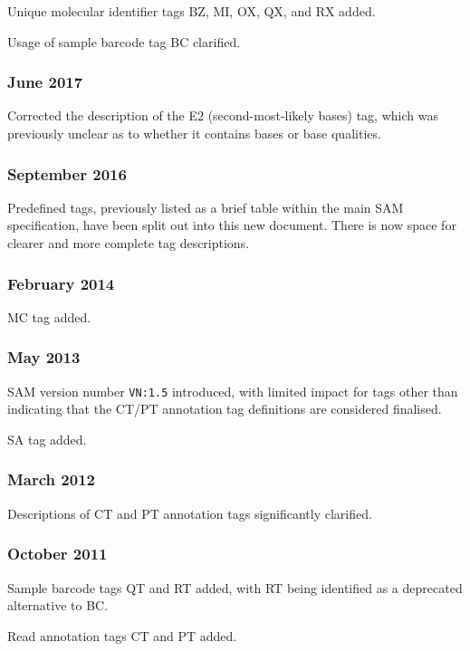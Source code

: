 \documentclass[10pt]{article}
\begin{document}
\begin{appendices}
Unique molecular identifier tags BZ, MI, OX, QX, and RX added.

Usage of sample barcode tag BC clarified.

\subsubsection*{June 2017}

Corrected the description of the E2 (second-most-likely bases) tag, which was previously unclear as to whether it contains bases or base qualities.

\subsubsection*{September 2016}

Predefined tags, previously listed as a brief table within the main SAM specification, have been split out into this new document.
There is now space for clearer and more complete tag descriptions.

\subsubsection*{February 2014}

MC tag added.

\subsubsection*{May 2013}

SAM version number {\tt VN:1.5} introduced, with limited impact for tags other than indicating that the CT/PT annotation tag definitions are considered finalised.

\gap
SA tag added.

\subsubsection*{March 2012}

Descriptions of CT and PT annotation tags significantly clarified.

\subsubsection*{October 2011}

Sample barcode tags QT and RT added, with RT being identified as a deprecated alternative to BC.

Read annotation tags CT and PT added.


\end{appendices}
\end{document}
